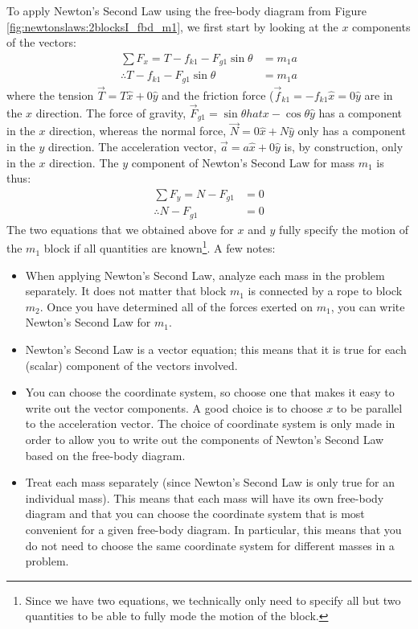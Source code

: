 To apply Newton's Second Law using the free-body diagram from Figure \ref{fig:newtonslaws:2blocksI_fbd_m1}, we first start by looking at the $x$ components of the vectors:
\begin{align*}
\sum F_x = T-f_{k1}-F_{g1}\sin\theta &= m_1 a\\
\therefore T-f_{k1}-F_{g1}\sin\theta &= m_1 a
\end{align*}
where the tension $\vec T = T\hat x+0\hat y$ and the friction force ($\vec f_{k1}=-f_{k1}\hat x=0\hat y$ are in the $x$ direction. The force of gravity, $\vec F_{g1}=\sin\theta hat x-\cos\theta \hat y$ has a component in the $x$ direction, whereas the normal force, $\vec N=0\hat x+N\hat y$ only has a component in the $y$ direction. The acceleration vector, $\vec a=a\hat x+0\hat y$ is, by construction, only in the $x$ direction. The $y$ component of Newton's Second Law for mass $m_1$ is thus:
\begin{align*}
\sum F_y = N-F_{g1}&=0\\
\therefore N-F_{g1}&=0
\end{align*}
The two equations that we obtained above for $x$ and $y$ fully specify the motion of the $m_1$ block if all quantities are known\footnote{Since we have two equations, we technically only need to specify all but two quantities to be able to fully mode the motion of the block.}. A few notes:
\begin{itemize}
\item When applying Newton's Second Law, analyze each mass in the problem separately. It does not matter that block $m_1$ is connected by a rope to block $m_2$. Once you have determined all of the forces exerted on $m_1$, you can write Newton's Second Law for $m_1$.
\item Newton's Second Law is a vector equation; this means that it is true for each (scalar) component of the vectors involved.
\item You can choose the coordinate system, so choose one that makes it easy to write out the vector components. A good choice is to choose $x$ to be parallel to the acceleration vector. The choice of coordinate system is only made in order to allow you to write out the components of Newton's Second Law based on the free-body diagram.
\item Treat each mass separately (since Newton's Second Law is only true for an individual mass). This means that each mass will have its own free-body diagram and that you can choose the coordinate system that is most convenient for a given free-body diagram. In particular, this means that you do not need to choose the same coordinate system for different masses in a problem.
\end{itemize}

